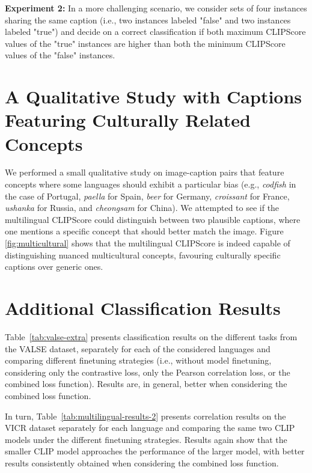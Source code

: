 \textbf{Experiment 2:} In a more challenging scenario, we consider sets of four instances sharing the same caption (i.e., two instances labeled "false" and two instances labeled "true") and decide on a correct classification if both maximum CLIPScore values of the "true" instances are higher than both the minimum CLIPScore values of the "false" instances. 

\section{A Qualitative Study with Captions Featuring Culturally Related Concepts}
\label{app:qualitative}

We performed a small qualitative study on image-caption pairs that feature concepts where some languages should exhibit a particular bias (e.g., {\it codfish} in the case of Portugal, {\it paella} for Spain, {\it beer} for Germany, {\it croissant} for France, {\it ushanka} for Russia, and {\it cheongsam} for China). We attempted to see if the multilingual CLIPScore could distinguish between two plausible captions, where one mentions a specific concept that should better match the image. Figure \ref{fig:multicultural} shows that the multilingual CLIPScore is indeed capable of distinguishing nuanced multicultural concepts, favouring culturally specific captions over generic ones.

\section{Additional Classification Results} \label{app:results}

Table~\ref{tab:valse-extra} presents classification results on the different tasks from the VALSE dataset, separately for each of the considered languages and comparing different finetuning strategies (i.e., without model finetuning, considering only the contrastive loss, only the Pearson correlation loss, or the combined loss function). Results are, in general, better when considering the combined loss function.

In turn, Table~\ref{tab:multilingual-results-2} presents correlation results on the VICR dataset separately for each language and comparing the same two CLIP models under the different finetuning strategies. Results again show that the smaller CLIP model approaches the performance of the larger model, with better results consistently obtained when considering the combined loss function.



